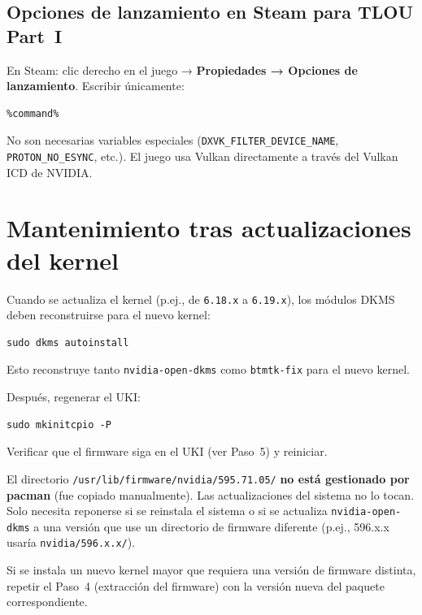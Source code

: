 \documentclass[12pt,a4paper]{article}
\begin{document}
\subsection{Opciones de lanzamiento en Steam para TLOU Part~I}

En Steam: clic derecho en el juego → \textbf{Propiedades → Opciones de
lanzamiento}. Escribir únicamente:

\begin{lstlisting}
%command%
\end{lstlisting}

No son necesarias variables especiales (\texttt{DXVK\_FILTER\_DEVICE\_NAME},
\texttt{PROTON\_NO\_ESYNC}, etc.). El juego usa Vulkan directamente a través
del Vulkan ICD de NVIDIA.

\section{Mantenimiento tras actualizaciones del kernel}

Cuando se actualiza el kernel (p.ej., de \texttt{6.18.x} a \texttt{6.19.x}),
los módulos DKMS deben reconstruirse para el nuevo kernel:

\begin{lstlisting}[style=bash]
sudo dkms autoinstall
\end{lstlisting}

Esto reconstruye tanto \texttt{nvidia-open-dkms} como \texttt{btmtk-fix} para
el nuevo kernel.

Después, regenerar el UKI:

\begin{lstlisting}[style=bash]
sudo mkinitcpio -P
\end{lstlisting}

Verificar que el firmware siga en el UKI (ver Paso~5) y reiniciar.

\begin{nota}
El directorio \texttt{/usr/lib/firmware/nvidia/595.71.05/} \textbf{no está
gestionado por pacman} (fue copiado manualmente). Las actualizaciones del
sistema no lo tocan. Solo necesita reponerse si se reinstala el sistema o si
se actualiza \texttt{nvidia-open-dkms} a una versión que use un directorio de
firmware diferente (p.ej., 596.x.x usaría \texttt{nvidia/596.x.x/}).
\end{nota}

Si se instala un nuevo kernel mayor que requiera una versión de firmware
distinta, repetir el Paso~4 (extracción del firmware) con la versión nueva
del paquete correspondiente.
\end{document}
